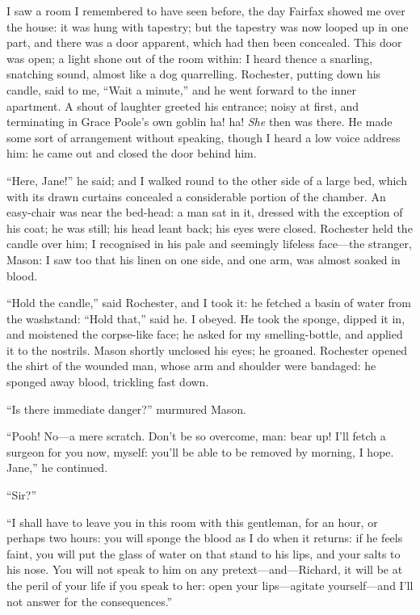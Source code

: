 I saw a room I remembered to have seen before, the day \Mrs{} Fairfax
showed me over the house: it was hung with tapestry; but the tapestry
was now looped up in one part, and there was a door apparent, which had
then been concealed. This door was open; a light shone out of the room
within: I heard thence a snarling, snatching sound, almost like a dog
quarrelling. \Mr{} Rochester, putting down his candle, said to me,
\enquote{Wait a minute,} and he went forward to the inner apartment. A
shout of laughter greeted his entrance; noisy at first, and terminating
in Grace Poole's own goblin ha! ha! \emph{She} then was there. He made
some sort of arrangement without speaking, though I heard a low voice
address him: he came out and closed the door behind him.

\enquote{Here, Jane!} he said; and I walked round to the other side of a
large bed, which with its drawn curtains concealed a considerable
portion of the chamber. An easy-chair was near the bed-head: a man sat
in it, dressed with the exception of his coat; he was still; his head
leant back; his eyes were closed. \Mr{} Rochester held the candle over
him; I recognised in his pale and seemingly lifeless face---the
stranger, Mason: I saw too that his linen on one side, and one arm, was
almost soaked in blood.

\enquote{Hold the candle,} said \Mr{} Rochester, and I took it: he fetched
a basin of water from the washstand: \enquote{Hold that,} said he. I
obeyed. He took the sponge, dipped it in, and moistened the corpse-like
face; he asked for my smelling-bottle, and applied it to the nostrils.
\Mr{} Mason shortly unclosed his eyes; he groaned. \Mr{} Rochester opened
the shirt of the wounded man, whose arm and shoulder were bandaged: he
sponged away blood, trickling fast down.

\enquote{Is there immediate danger?} murmured \Mr{} Mason.

\enquote{Pooh! No---a mere scratch. Don't be so overcome, man: bear
	up! I'll fetch a surgeon for you now, myself: you'll be able to be
	removed by morning, I hope. Jane,} he continued.

\enquote{Sir?}

\enquote{I shall have to leave you in this room with this gentleman, for
	an hour, or perhaps two hours: you will sponge the blood as I do when it
	returns: if he feels faint, you will put the glass of water on that
	stand to his lips, and your salts to his nose. You will not speak to
	him on any pretext---and---Richard, it will be at the peril of your life
	if you speak to her: open your lips---agitate yourself---and I'll not
	answer for the consequences.}

